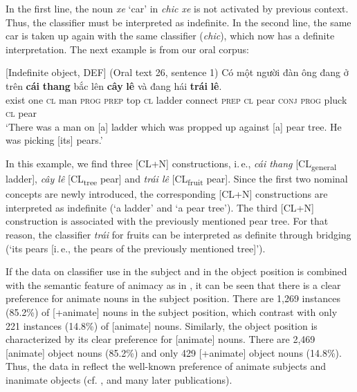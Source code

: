 \documentclass[output=paper]{langsci/langscibook}
\begin{document}
In the first line, the noun {\emph{xe}} `car' in {\emph{chi{\dae}c xe}} is not activated by previous context. Thus, the classifier must be interpreted as indefinite. In the second line, the same car is taken up again with the same classifier ({\emph{chi{\dae}c}}), which now has a definite interpretation. The next example is from our oral corpus:

\begin{samepage}
\begin{exe}
\ex\label{1ex:16}
[Indefinite object, \pm DEF] (Oral text 26, sentence 1)
\exi{}
\gll 	Có    một	người	{đàn ông}	đang			ở          		trên  {\textbf{cái}}  {\textbf{thang}}   bắc        lên       {\textbf{cây}}  {\textbf{lê}}  và         đang    hái       {\textbf{trái}}  {\textbf{lê}}. \\
	exist one	{\textsc{cl}}     man		{\textsc{prog}}		{\textsc{prep}}   	top   {\textsc{cl}}  ladder  connect  {\textsc{prep}}  {\textsc{cl}}  pear {\textsc{conj}}  {\textsc{prog}}   pluck  {\textsc{cl}}   pear\\
\glt `There was a man on [a] ladder which was propped up against [a] pear tree. He was picking [its] pears.'
\end{exe}
\end{samepage}

{
In this example, we find three [CL+N] constructions, i.\,e., {\emph{cái thang}} [CL\textsubscript{general} ladder], {\emph{cây lê}} [CL\textsubscript{tree} pear] and {\emph{trái lê}} [CL\textsubscript{fruit} pear]. Since the first two nominal concepts are newly introduced, the corresponding [CL+N] constructions are interpreted as indefinite (`a ladder' and `a pear tree'). The third [CL+N] construction is associated with the previously mentioned pear tree. For that reason, the classifier {\emph{trái}} for fruits can be interpreted as definite through bridging (`its pears [i.\,e., the pears of the previously mentioned tree]').
}

If the data on classifier use in the subject and in the object position is combined with the semantic feature of animacy as in , it can be seen that there is a clear preference for animate nouns in the subject position. There are 1,269 instances (85.2\%) of [+animate] nouns in the subject position, which contrast with only 221 instances (14.8\%) of [\minus animate] nouns. Similarly, the object position is characterized by its clear preference for [\minus animate] nouns. There are 2,469 [\minus animate] object nouns (85.2\%) and only 429 [+animate] object nouns (14.8\%). Thus, the data in  reflect the well-known preference of animate subjects and inanimate objects (cf. \citealt{givon:79}, \citealt{dubois:87} and many later publications).
\end{document}
